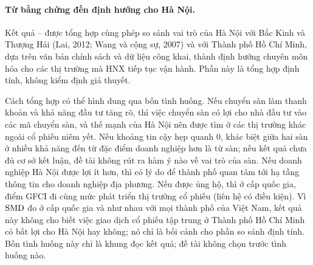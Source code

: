 \paragraph{Từ bằng chứng đến định hướng cho Hà Nội.} Kết quả -- được tổng hợp cùng phép so sánh vai trò của Hà Nội với Bắc Kinh và Thượng Hải (Lai, 2012; Wang và cộng sự, 2007) và với Thành phố Hồ Chí Minh, dựa trên văn bản chính sách và dữ liệu công khai, thành định hướng chuyên môn hóa cho các thị trường mà HNX tiếp tục vận hành. Phần này là tổng hợp định tính, không kiểm định giả thuyết.

Cách tổng hợp có thể hình dung qua bốn tình huống. Nếu chuyển sàn làm thanh khoản và khả năng đầu tư tăng rõ, thì việc chuyển sàn có lợi cho nhà đầu tư vào các mã chuyển sàn, và thế mạnh của Hà Nội nên được tìm ở các thị trường khác ngoài cổ phiếu niêm yết. Nếu khoảng tin cậy hẹp quanh 0, khác biệt giữa hai sàn ở  nhiều khả năng đến từ đặc điểm doanh nghiệp hơn là từ sàn; nếu kết quả chưa đủ cơ sở kết luận, đề tài không rút ra hàm ý nào về vai trò của sàn. Nếu doanh nghiệp Hà Nội được lợi ít hơn, thì có lý do để thành phố quan tâm tới hạ tầng thông tin cho doanh nghiệp địa phương. Nếu  được ủng hộ, thì ở cấp quốc gia, điểm GFCI đi cùng mức phát triển thị trường cổ phiếu (liên hệ có điều kiện). Vì $\mathrm{SMD}$ đo ở cấp quốc gia và như nhau với mọi thành phố của Việt Nam, kết quả này không cho biết việc giao dịch cổ phiếu tập trung ở Thành phố Hồ Chí Minh có bất lợi cho Hà Nội hay không; nó chỉ là bối cảnh cho phần so sánh định tính. Bốn tình huống này chỉ là khung đọc kết quả; đề tài không chọn trước tình huống nào.

